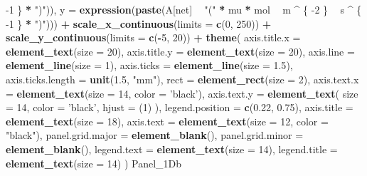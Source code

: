 \documentclass[
]{krantz}
\makeatletter
\newenvironment{Shaded}{\begin{snugshade}}{\end{snugshade}}
\newcommand{\DataTypeTok}[1]{\textcolor[rgb]{0.13,0.29,0.53}{#1}}
\newcommand{\DecValTok}[1]{\textcolor[rgb]{0.00,0.00,0.81}{#1}}
\newcommand{\FloatTok}[1]{\textcolor[rgb]{0.00,0.00,0.81}{#1}}
\newcommand{\KeywordTok}[1]{\textcolor[rgb]{0.13,0.29,0.53}{\textbf{#1}}}
\newcommand{\NormalTok}[1]{#1}
\newcommand{\OperatorTok}[1]{\textcolor[rgb]{0.81,0.36,0.00}{\textbf{#1}}}
\newcommand{\StringTok}[1]{\textcolor[rgb]{0.31,0.60,0.02}{#1}}
\newenvironment{kframe}{%
\medskip{}
\setlength{\fboxsep}{.8em}
 \def\at@end@of@kframe{}%
 \ifinner\ifhmode%
  \def\at@end@of@kframe{\end{minipage}}%
  \begin{minipage}{\columnwidth}%
 \fi\fi%
 \def\FrameCommand##1{\hskip\@totalleftmargin \hskip-\fboxsep
 \colorbox{shadecolor}{##1}\hskip-\fboxsep
     \hskip-\linewidth \hskip-\@totalleftmargin \hskip\columnwidth}%
 \MakeFramed {\advance\hsize-\width
   \@totalleftmargin\z@ \linewidth\hsize
   \@setminipage}}%
 {\par\unskip\endMakeFramed%
 \at@end@of@kframe}
\renewenvironment{Shaded}{\begin{kframe}}{\end{kframe}}
\makeatother
\begin{document}
\begin{Shaded}
\begin{Highlighting}[]
    \DecValTok{-1}
\NormalTok{  \} }\OperatorTok{*}\StringTok{ ")"}\NormalTok{)), }\DataTypeTok{y =} \KeywordTok{expression}\NormalTok{(}\KeywordTok{paste}\NormalTok{(A[net] }\OperatorTok{~}\StringTok{ "("} \OperatorTok{*}\StringTok{ }\NormalTok{mu }\OperatorTok{*}\StringTok{ }\NormalTok{mol }\OperatorTok{~}\StringTok{ }\NormalTok{m }\OperatorTok{^}\StringTok{ }\NormalTok{\{}
    \DecValTok{-2}
\NormalTok{  \} }\OperatorTok{~}\StringTok{ }\NormalTok{s }\OperatorTok{^}\StringTok{ }\NormalTok{\{}
    \DecValTok{-1}
\NormalTok{  \} }\OperatorTok{*}\StringTok{ ")"}\NormalTok{))) }\OperatorTok{+}
\StringTok{  }\KeywordTok{scale_x_continuous}\NormalTok{(}\DataTypeTok{limits =} \KeywordTok{c}\NormalTok{(}\DecValTok{0}\NormalTok{, }\DecValTok{250}\NormalTok{)) }\OperatorTok{+}
\StringTok{  }\KeywordTok{scale_y_continuous}\NormalTok{(}\DataTypeTok{limits =} \KeywordTok{c}\NormalTok{(}\OperatorTok{-}\DecValTok{5}\NormalTok{, }\DecValTok{20}\NormalTok{)) }\OperatorTok{+}
\StringTok{  }\KeywordTok{theme}\NormalTok{(}
    \DataTypeTok{axis.title.x =} \KeywordTok{element_text}\NormalTok{(}\DataTypeTok{size =} \DecValTok{20}\NormalTok{),}
    \DataTypeTok{axis.title.y =} \KeywordTok{element_text}\NormalTok{(}\DataTypeTok{size =} \DecValTok{20}\NormalTok{),}
    \DataTypeTok{axis.line =} \KeywordTok{element_line}\NormalTok{(}\DataTypeTok{size =} \DecValTok{1}\NormalTok{),}
    \DataTypeTok{axis.ticks =} \KeywordTok{element_line}\NormalTok{(}\DataTypeTok{size =} \FloatTok{1.5}\NormalTok{),}
    \DataTypeTok{axis.ticks.length =} \KeywordTok{unit}\NormalTok{(}\FloatTok{1.5}\NormalTok{, }\StringTok{"mm"}\NormalTok{),}
    \DataTypeTok{rect =} \KeywordTok{element_rect}\NormalTok{(}\DataTypeTok{size =} \DecValTok{2}\NormalTok{),}
    \DataTypeTok{axis.text.x =} \KeywordTok{element_text}\NormalTok{(}\DataTypeTok{size =} \DecValTok{14}\NormalTok{, }\DataTypeTok{color =} \StringTok{'black'}\NormalTok{),}
    \DataTypeTok{axis.text.y =}
      \KeywordTok{element_text}\NormalTok{(}
        \DataTypeTok{size =} \DecValTok{14}\NormalTok{,}
        \DataTypeTok{color =} \StringTok{'black'}\NormalTok{,}
        \DataTypeTok{hjust =}\NormalTok{ (}\DecValTok{1}\NormalTok{)}
\NormalTok{      ),}
    \DataTypeTok{legend.position =} \KeywordTok{c}\NormalTok{(}\FloatTok{0.22}\NormalTok{, }\FloatTok{0.75}\NormalTok{),}
    \DataTypeTok{axis.title =} \KeywordTok{element_text}\NormalTok{(}\DataTypeTok{size =} \DecValTok{18}\NormalTok{),}
    \DataTypeTok{axis.text =} \KeywordTok{element_text}\NormalTok{(}\DataTypeTok{size =} \DecValTok{12}\NormalTok{, }\DataTypeTok{color =} \StringTok{"black"}\NormalTok{),}
    \DataTypeTok{panel.grid.major =} \KeywordTok{element_blank}\NormalTok{(),}
    \DataTypeTok{panel.grid.minor =} \KeywordTok{element_blank}\NormalTok{(),}
    \DataTypeTok{legend.text =} \KeywordTok{element_text}\NormalTok{(}\DataTypeTok{size =} \DecValTok{14}\NormalTok{),}
    \DataTypeTok{legend.title =} \KeywordTok{element_text}\NormalTok{(}\DataTypeTok{size =} \DecValTok{14}\NormalTok{)}
\NormalTok{  )}
\NormalTok{Panel_1Db}
\end{Highlighting}
\end{Shaded}
\end{document}

